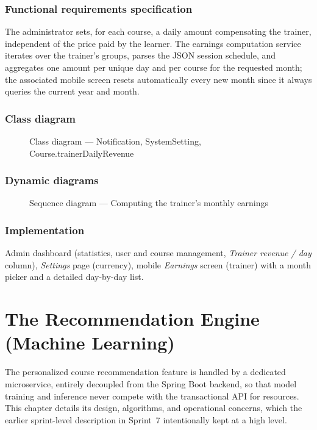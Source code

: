 \documentclass[a4paper,12pt]{report}
\begin{document}
\subsection{Functional requirements specification}
The administrator sets, for each course, a daily amount compensating the
trainer, independent of the price paid by the learner. The earnings
computation service iterates over the trainer's groups, parses the JSON
session schedule, and aggregates one amount per unique day and per course
for the requested month; the associated mobile screen resets automatically
every new month since it always queries the current year and month.

\subsection{Class diagram}
\begin{figure}[H]
\centering
\caption{Class diagram --- Notification, SystemSetting, Course.trainerDailyRevenue}
\end{figure}

\subsection{Dynamic diagrams}
\begin{figure}[H]
\centering
\caption{Sequence diagram --- Computing the trainer's monthly earnings}
\end{figure}

\subsection{Implementation}
Admin dashboard (statistics, user and course management, \emph{Trainer
revenue / day} column), \emph{Settings} page (currency), mobile
\emph{Earnings} screen (trainer) with a month picker and a detailed
day-by-day list.

\chapter{The Recommendation Engine (Machine Learning)}
\label{chap:ml}

The personalized course recommendation feature is handled by a dedicated
microservice, entirely decoupled from the Spring Boot backend, so that
model training and inference never compete with the transactional API for
resources. This chapter details its design, algorithms, and operational
concerns, which the earlier sprint-level description in Sprint~7
intentionally kept at a high level.
\end{document}
